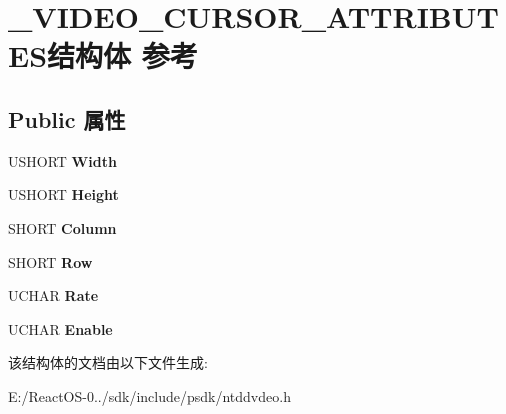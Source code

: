 \hypertarget{struct___v_i_d_e_o___c_u_r_s_o_r___a_t_t_r_i_b_u_t_e_s}{}\section{\+\_\+\+V\+I\+D\+E\+O\+\_\+\+C\+U\+R\+S\+O\+R\+\_\+\+A\+T\+T\+R\+I\+B\+U\+T\+E\+S结构体 参考}
\label{struct___v_i_d_e_o___c_u_r_s_o_r___a_t_t_r_i_b_u_t_e_s}
\subsection*{Public 属性}
\begin{DoxyCompactItemize}
\item 
\mbox{\label{struct___v_i_d_e_o___c_u_r_s_o_r___a_t_t_r_i_b_u_t_e_s_a998bcf8b7f762c3eb26f8c9824da9368}} 
U\+S\+H\+O\+RT {\bfseries Width}
\item 
\mbox{\label{struct___v_i_d_e_o___c_u_r_s_o_r___a_t_t_r_i_b_u_t_e_s_ae65ff68c141615cfcf75ac4da68cf8aa}} 
U\+S\+H\+O\+RT {\bfseries Height}
\item 
\mbox{\label{struct___v_i_d_e_o___c_u_r_s_o_r___a_t_t_r_i_b_u_t_e_s_a3e5e31847de9f19aeb2288d0f99cb814}} 
S\+H\+O\+RT {\bfseries Column}
\item 
\mbox{\label{struct___v_i_d_e_o___c_u_r_s_o_r___a_t_t_r_i_b_u_t_e_s_a6b86427ba8cc6210f87f646c25f4e099}} 
S\+H\+O\+RT {\bfseries Row}
\item 
\mbox{\label{struct___v_i_d_e_o___c_u_r_s_o_r___a_t_t_r_i_b_u_t_e_s_aa086baf3732d4a806488181120f86cd4}} 
U\+C\+H\+AR {\bfseries Rate}
\item 
\mbox{\label{struct___v_i_d_e_o___c_u_r_s_o_r___a_t_t_r_i_b_u_t_e_s_a69695f5728c721ea9384734eccf327bd}} 
U\+C\+H\+AR {\bfseries Enable}
\end{DoxyCompactItemize}


该结构体的文档由以下文件生成\+:\begin{DoxyCompactItemize}
\item 
E\+:/\+React\+O\+S-\/0../sdk/include/psdk/ntddvdeo.\+h\end{DoxyCompactItemize}
